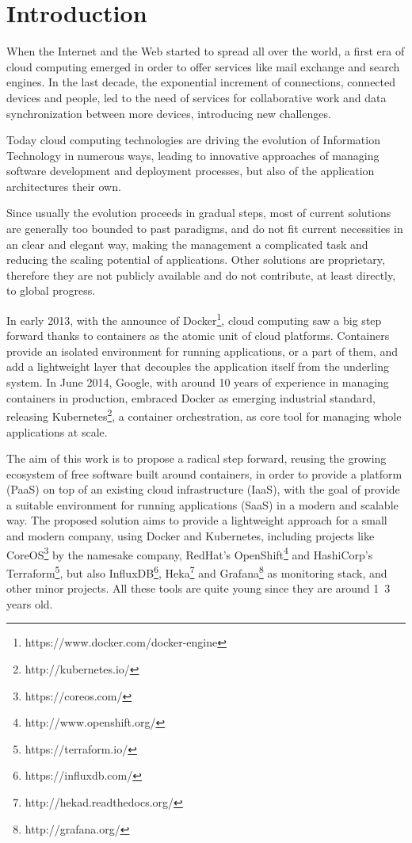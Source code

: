 \chapter{Introduction}\label{introduction}

When the Internet and the Web started to spread all over the world, a first era of cloud computing\cite{A Break in the Clouds: Towards a Cloud Definition} emerged in order to offer services like mail exchange and search engines.  In the last decade,  the exponential increment of connections, connected devices and people, led to the need of services for collaborative work and data synchronization between more devices, introducing new challenges.

Today cloud computing technologies are driving the evolution of Information Technology in numerous ways, leading to innovative approaches of managing software development and deployment processes, but also of the application architectures their own.

Since usually the evolution proceeds in gradual steps, most of current solutions are generally too bounded to past paradigms, and do not fit current necessities in an clear and elegant way, making the management a complicated task and reducing the scaling potential of applications.  Other solutions are proprietary, therefore they are not publicly available and do not contribute, at least directly, to global progress.

In early 2013, with the announce of Docker\footnote{https://www.docker.com/docker-engine}, cloud computing saw a big step forward thanks to containers as the atomic unit of cloud platforms.  Containers provide an isolated environment for running applications, or a part of them, and add a lightweight layer that decouples the application itself from the underling system.  In June 2014, Google, with around 10 years of experience in managing containers in production, embraced Docker as emerging industrial standard, releasing Kubernetes\footnote{http://kubernetes.io/}, a container orchestration, as core tool for managing whole applications at scale.

The aim of this work is to propose a radical step forward, reusing the growing ecosystem of free software built around containers, in order to provide a platform\cite{Developing Software Online With Platform-as-a-Service Technology} (PaaS) on top of an existing cloud infrastructure\cite{A survey and taxonomy of infrastructure as a service and web hosting cloud providers} (IaaS), with the goal of provide a suitable environment for running applications\cite{Understanding service-oriented software} (SaaS) in a modern and scalable way.  The proposed solution aims to provide a lightweight approach for a small and modern company, using Docker and Kubernetes, including projects like CoreOS\footnote{https://coreos.com/} by the namesake company, RedHat's OpenShift\footnote{http://www.openshift.org/} and HashiCorp's Terraform\footnote{https://terraform.io/}, but also InfluxDB\footnote{https://influxdb.com/}, Heka\footnote{http://hekad.readthedocs.org/} and Grafana\footnote{http://grafana.org/} as monitoring stack, and other minor projects.  All these tools are quite young since they are around 1~3 years old.

